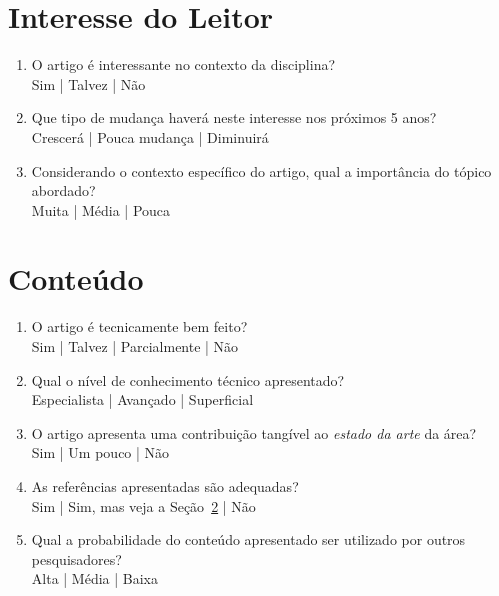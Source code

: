 \documentclass{UnBExam}%
\begin{document}

    \section{Interesse do Leitor}%
    \begin{enumerate}
        \item O artigo é interessante no contexto da disciplina?\\%
        Sim | Talvez | Não

        \item Que tipo de mudança haverá neste interesse nos próximos 5 anos?\\%
        Crescerá | Pouca mudança | Diminuirá

        \item Considerando o contexto específico do artigo, qual a importância
        do tópico abordado?\\%
        Muita | Média | Pouca
    \end{enumerate}%

    \section{Conteúdo}%
    \begin{enumerate}
        \item O artigo é tecnicamente bem feito?\\%
        Sim | Talvez | Parcialmente | Não

        \item Qual o nível de conhecimento técnico apresentado?\\%
        Especialista | Avançado | Superficial

        \item O artigo apresenta uma contribuição tangível ao \emph{estado da
        arte} da área?\\%
        Sim | Um pouco | Não

        \item As referências apresentadas são adequadas?\\%
        Sim | Sim, mas veja a Seção~\ref{} | Não

        \item Qual a probabilidade do conteúdo apresentado ser utilizado por
        outros pesquisadores?\\%
        Alta | Média | Baixa
    \end{enumerate}%
\end{document}
